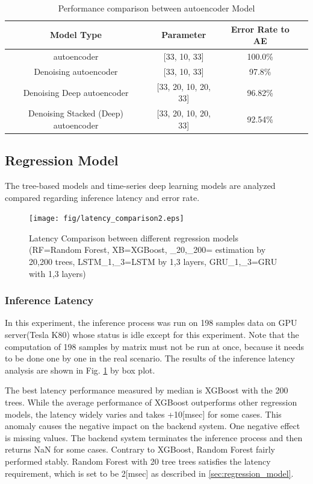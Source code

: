 \documentclass[runningheads]{llncs}
\begin{document}
 \begin{table}[t]
  \begin{center}
   \caption{Performance comparison between autoencoder Model}
   \label{tab1:autoencoder_result}
   \begin{tabular}{|c|c|c|c|}
    \hline
    Model Type & Parameter & Error Rate to AE\\
    \hline
    autoencoder & [33, 10, 33] & 100.0\% \\
    Denoising autoencoder &  [33, 10, 33] & 97.8\% \\
    Denoising Deep autoencoder & [33, 20, 10, 20, 33] & 96.82\% \\
    Denoising Stacked (Deep) autoencoder & [33, 20, 10, 20, 33] & 92.54\% \\
    \hline
   \end{tabular}
  \end{center}
 \end{table}

\subsection{Regression Model}
The tree-based models and time-series deep learning models are analyzed compared regarding inference latency and error rate.

\begin{figure}[t]
 \begin{center}
  \texttt{[image: fig/latency\_comparison2.eps]}
  \caption{Latency Comparison between different regression models (RF=Random Forest, XB=XGBoost, \_20,\_200= estimation by 20,200 trees, LSTM\_1,\_3=LSTM by 1,3 layers, GRU\_1,\_3=GRU with 1,3 layers)}
  \label{fig:latency_comparison}
 \end{center}
\end{figure}

\subsubsection{Inference Latency}
In this experiment, the inference process was run on 198 samples data on GPU server(Tesla K80) whose status is idle except for this experiment. Note that the computation of 198 samples by matrix must not be run at once, because it needs to be done one by one in the real scenario. The results of the inference latency analysis are shown in Fig. \ref{fig:latency_comparison} by box plot.

The best latency performance measured by median is XGBoost with the 200 trees. While the average performance of XGBoost outperforms other regression models, the latency widely varies and takes +10[msec] for some cases. This anomaly causes the negative impact on the backend system. One negative effect is missing values. The backend system terminates the inference process and then returns NaN for some cases. Contrary to XGBoost, Random Forest fairly performed stably. Random Forest with 20 tree trees satisfies the latency requirement, which is set to be 2[msec] as described in \ref{sec:regression_model}.
\end{document}
